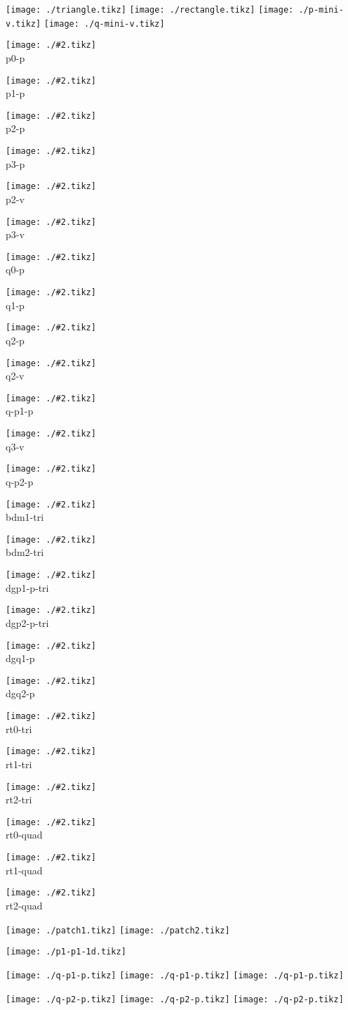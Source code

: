 \documentclass{article}
\newcommand{\showtikz}[2]{\begin{minipage}{#1\textwidth}
    \begin{center}
      \texttt{[image: ./\#2.tikz]}
      \\
      #2
    \end{center}
  \end{minipage}
}
\begin{document}
\texttt{[image: ./triangle.tikz]}
\texttt{[image: ./rectangle.tikz]}
\texttt{[image: ./p-mini-v.tikz]}
\texttt{[image: ./q-mini-v.tikz]}

\showtikz{.24}{p0-p}
\showtikz{.24}{p1-p}
\showtikz{.24}{p2-p}
\showtikz{.24}{p3-p}

\showtikz{.24}{p2-v}
\showtikz{.24}{p3-v}

\showtikz{.24}{q0-p}
\showtikz{.24}{q1-p}
\showtikz{.24}{q2-p}

\showtikz{.24}{q2-v}
\showtikz{.24}{q-p1-p}
\showtikz{.24}{q3-v}
\showtikz{.24}{q-p2-p}

\showtikz{.24}{bdm1-tri}
\showtikz{.24}{bdm2-tri}

\showtikz{.24}{dgp1-p-tri}
\showtikz{.24}{dgp2-p-tri}
\showtikz{.24}{dgq1-p}
\showtikz{.24}{dgq2-p}

\showtikz{.24}{rt0-tri}
\showtikz{.24}{rt1-tri}
\showtikz{.24}{rt2-tri}

\showtikz{.24}{rt0-quad}
\showtikz{.24}{rt1-quad}
\showtikz{.24}{rt2-quad}


\texttt{[image: ./patch1.tikz]}
\texttt{[image: ./patch2.tikz]}

\texttt{[image: ./p1-p1-1d.tikz]}

\texttt{[image: ./q-p1-p.tikz]}
\texttt{[image: ./q-p1-p.tikz]}
\texttt{[image: ./q-p1-p.tikz]}

\texttt{[image: ./q-p2-p.tikz]}
\texttt{[image: ./q-p2-p.tikz]}
\texttt{[image: ./q-p2-p.tikz]}

\end{document}
